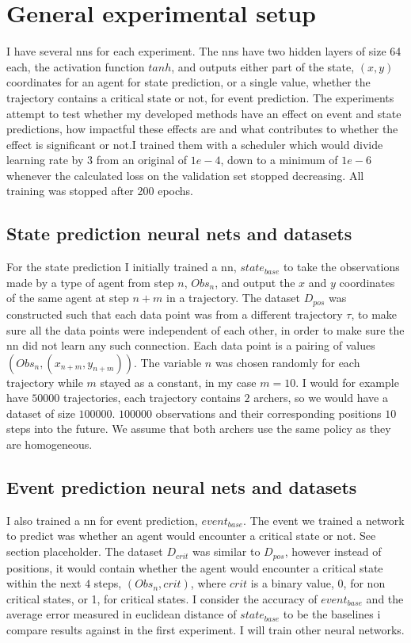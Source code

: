 \documentclass[UKenglish]{uiomasterthesis}
\begin{document}
\section{General experimental setup}
I have several \acp{nn} for each experiment. The \acp{nn} have two hidden layers of size 64 each, the activation function $tanh$, and outputs either part of the state, $(x,y)$ coordinates for an agent for state prediction, or a single value, whether the trajectory contains a critical state or not, for event prediction. The experiments attempt to test whether my developed methods have an effect on event and state predictions, how impactful these effects are and what contributes to whether the effect is significant or not.I trained them with a scheduler which would divide learning rate by $3$ from an original of $1e-4$, down to a minimum of $1e-6$ whenever the calculated loss on the validation set stopped decreasing. All training was stopped after 200 epochs.

\subsection{State prediction neural nets and datasets}
For the state prediction I initially trained a \ac{nn}, $state_{base}$ to take the observations made by a type of agent from step $n$, $Obs_n$, and output the $x$ and $y$ coordinates of the same agent at step $n+m$ in a trajectory. The dataset $D_{pos}$ was constructed such that each data point was from a different trajectory $\tau$, to make sure all the data points were independent of each other, in order to make sure the \ac{nn} did not learn any such connection. Each data point is a pairing of values $(Obs_n, (x_{n+m},y_{n+m}))$. The variable $n$ was chosen randomly for each trajectory while $m$ stayed as a constant, in my case $m=10$. I would for example have $50000$ trajectories, each trajectory contains $2$ archers, so we would have a dataset of size $100000$. $100000$ observations and their corresponding positions $10$ steps into the future. We assume that both archers use the same policy as they are homogeneous.

\subsection{Event prediction neural nets and datasets}
I also trained a \ac{nn} for event prediction, $event_{base}$. The event we trained a network to predict was whether an agent would encounter a critical state or not. See section placeholder. The dataset $D_{crit}$ was similar to $D_{pos}$, however instead of positions, it would contain whether the agent would encounter a critical state within the next $4$ steps, $(Obs_n, crit)$, where $crit$ is a binary value, 0, for non critical states, or 1, for critical states.
I consider the accuracy of $event_{base}$ and the average error measured in euclidean distance of $state_{base}$ to be the baselines i compare results against in the first experiment. I will train other neural networks.
\end{document}
